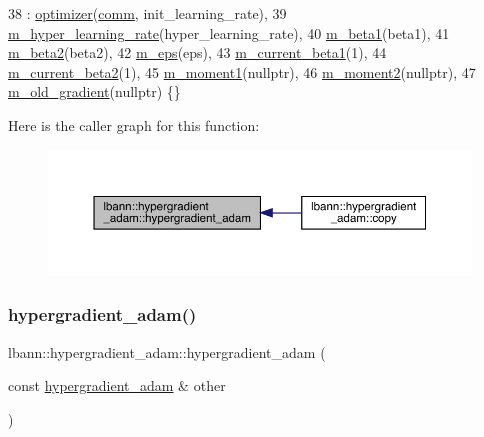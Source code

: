 \begin{DoxyCode}
38   : \hyperlink{classlbann_1_1optimizer_a136ed79c3f279ecded5be380fb67b05f}{optimizer}(\hyperlink{file__io_8cpp_ab048c6f9fcbcfaa57ce68b00263dbebe}{comm}, init\_learning\_rate),
39     \hyperlink{classlbann_1_1hypergradient__adam_a1066721ebaadb4eed2554b159510ae44}{m\_hyper\_learning\_rate}(hyper\_learning\_rate),
40     \hyperlink{classlbann_1_1hypergradient__adam_a876a8bc1ee9a47479008d204048724e7}{m\_beta1}(beta1),
41     \hyperlink{classlbann_1_1hypergradient__adam_a0effe7359fa37f02a40f059281580760}{m\_beta2}(beta2),
42     \hyperlink{classlbann_1_1hypergradient__adam_a5bae9101fcc235d961ae7713706f4ff7}{m\_eps}(eps),
43     \hyperlink{classlbann_1_1hypergradient__adam_a671c622860c712ef9716c2c8c6714780}{m\_current\_beta1}(1),
44     \hyperlink{classlbann_1_1hypergradient__adam_a2d8b00faecbf4ce3996f879566ca4064}{m\_current\_beta2}(1),
45     \hyperlink{classlbann_1_1hypergradient__adam_a529f3b53732247ebfb649f55f1fae4d6}{m\_moment1}(\textcolor{keyword}{nullptr}),
46     \hyperlink{classlbann_1_1hypergradient__adam_a73b77fb79bd8e9bbfc8f360197899d18}{m\_moment2}(\textcolor{keyword}{nullptr}),
47     \hyperlink{classlbann_1_1hypergradient__adam_a2e52355f77edf55bdac8a3eed79f44c4}{m\_old\_gradient}(\textcolor{keyword}{nullptr}) \{\}
\end{DoxyCode}
Here is the caller graph for this function\+:\nopagebreak
\begin{figure}[H]
\begin{center}
\leavevmode
\includegraphics[width=350pt]{classlbann_1_1hypergradient__adam_aefb4d2c307d8f7997624b2ebe977ca3b_icgraph}
\end{center}
\end{figure}
\mbox{\label{classlbann_1_1hypergradient__adam_aadb9841237fca01bbe2187a39e8f3cc5}} 
\subsubsection{\texorpdfstring{hypergradient\+\_\+adam()}{hypergradient\_adam()}\hspace{0.1cm}{\footnotesize\ttfamily [2/2]}}
{\footnotesize\ttfamily lbann\+::hypergradient\+\_\+adam\+::hypergradient\+\_\+adam (\begin{DoxyParamCaption}\item[{const \hyperlink{classlbann_1_1hypergradient__adam}{hypergradient\+\_\+adam} \&}]{other }\end{DoxyParamCaption})}

